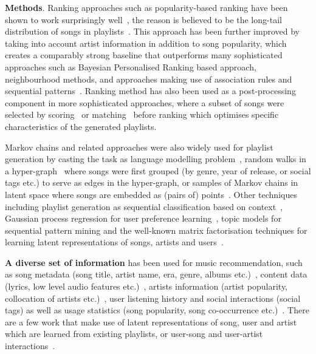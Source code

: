 {\bf Methods}.
Ranking approaches such as popularity-based ranking have been shown to
work surprisingly well~\cite{mcfee2012million,bonnin2013evaluating},
the reason is believed to be the long-tail distribution of songs in 
playlists~\cite{cremonesi2010performance,bonnin2013evaluating}.
%
This approach has been further improved by taking into account artist information in addition to
song popularity, which creates a comparably strong baseline that outperforms many sophisticated 
approaches such as Bayesian Personalised Ranking based approach, neighbourhood methods, and approaches 
making use of association rules and sequential patterns~\cite{mcfee2012million,bonnin2013evaluating}.
%
Ranking method has also been used as a post-processing component in more sophisticated approaches,
where a subset of songs were selected by scoring~\cite{jannach2015beyond} or matching~\cite{hariri2012context}
before ranking which optimises specific characteristics of the generated playlists.


Markov chains and related approaches were also widely used for playlist generation by casting the task
as language modelling problem~\cite{mcfee2011natural},
random walks in a hyper-graph~\cite{mcfee2012hypergraph} where songs were first grouped (by genre, 
year of release, or social tags etc.) to serve as edges in the hyper-graph, or samples of Markov chains 
in latent space where songs are embedded as (pairs of) points~\cite{chen2012playlist}.
%
Other techniques including playlist generation as sequential classification based on context~\cite{ben2017groove},
Gaussian process regression for user preference learning~\cite{platt2002learning},
topic models for sequential pattern mining and the well-known matrix factorisation techniques for learning 
latent representations of songs, artists and users~\cite{mcfee2012hypergraph,chen2012playlist,ben2017groove}.


{\bf A diverse set of information} has been used for music recommendation,
such as song metadata (\eg song title, artist name, era, genre, albums etc.)~\cite{hariri2012context,platt2002learning},
content data (\eg lyrics, low level audio features etc.)~\cite{mcfee2011natural,mcfee2012hypergraph,jannach2015beyond,ben2017groove},
artists information (\eg artist popularity, collocation of artists etc.)~\cite{bonnin2013evaluating,ben2017groove},
user listening history and social interactions (\eg social tags) as well as usage statistics (\eg song popularity, 
song co-occurrence etc.)~\cite{mcfee2012hypergraph,hariri2012context,bonnin2013evaluating,jannach2015beyond,ben2017groove}.
There are a few work that make use of latent representations of song, user and artist which are learned from existing playlists, 
or user-song and user-artist interactions~\cite{chen2012playlist,ben2017groove}.

